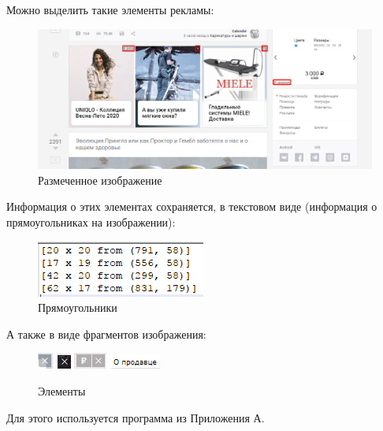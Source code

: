 \documentclass[a4paper,12pt,preview]{report} %
\begin{document}
	Можно выделить такие элементы рекламы:
	
	\begin{figure}[H]
		\centering\includegraphics[scale=0.4]{md1.PNG}
		\caption{Размеченное изображение}
		\label{fig:md1}
	\end{figure}
	
	Информация о этих элементах сохраняется, в текстовом виде (информация о прямоугольниках на изображении):
	
	\begin{figure}[H]
		\centering\includegraphics[scale=1.5]{rects1.PNG}
		\caption{Прямоугольники}
		\label{fig:rects1}
	\end{figure}
	
	А также в виде фрагментов изображения:
	
	\begin{figure}[H]
		\centering\includegraphics[scale=1.5]{el1.PNG}\text{ }
		\centering\includegraphics[scale=1.5]{el2.PNG}\text{ }
		\centering\includegraphics[scale=1.5]{el3.PNG}\text{ }
		\centering\includegraphics[scale=1.5]{el4.PNG}\text{ }
		\caption{Элементы}
		\label{fig:ele1}
	\end{figure}
	
	Для этого используется программа из Приложения А.
\end{document}
